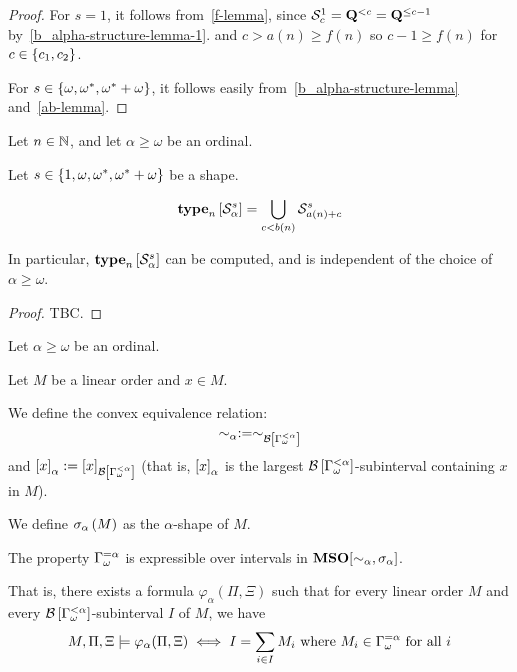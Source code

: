 \begin{proof}
  For $s = 1$, it follows from~\cref{f-lemma}, since $\mathcal{S}^{1}_{c} = \mathbf{Q}^{< c} = \mathbf{Q}^{\le c-1}$
  by~\cref{b_alpha-structure-lemma-1}.
  and $c > a(n) \ge f(n)$ so $c-1 \ge f(n)$ for $c \in \left\{ {c_1, c_2} \right\}$.

  For $s \in \left\{ {\omega, \omega^\ast, \omega^\ast + \omega} \right\}$, it follows easily from~\cref{b_alpha-structure-lemma}
  and~\cref{ab-lemma}.
\end{proof}

\begin{lemma}
  Let $n \in \mathbb{N}$, and let $\alpha \ge \omega$ be an ordinal.

  Let $s \in \left\{ {1, \omega, \omega^\ast, \omega^\ast + \omega} \right\}$ be a shape.

  \[\mathbf{type}_{n} \left[ {\mathcal{S}^{s}_{\alpha}} \right] = \bigcup_{c < b(n)}{\mathcal{S}^{s}_{a(n) + c}                                                                                                                                                                                                                                                                                                                                                                                                                                       }\]

  In particular, $\mathbf{type}_{n} \left[ {\mathcal{S}^{s}_{\alpha}} \right]$ can be
  computed, and is independent of the choice of $\alpha \ge \omega$.
\end{lemma}

\begin{proof}
  TBC.
  
\end{proof}

\begin{definition}
  Let $\alpha \ge \omega$ be an ordinal.

  Let $M$ be a linear order and $x \in M$.

  We define the convex equivalence relation: 
  \[\sim_\alpha := \sim_{\mathcal{B} \left[ {{\Gamma_{\omega}^{< \alpha}}} \right]}\]
  and $\left[ {x} \right]_{\alpha} := \left[ {x} \right]_{\mathcal{B} \left[ {{\Gamma_{\omega}^{< \alpha}}} \right]}$ (that is,
  $\left[ {x} \right]_{\alpha}$ is the largest $\mathcal{B} \left[ {{\Gamma_{\omega}^{< \alpha}}} \right]$-subinterval
  containing $x$ in $M$).

  We define $\sigma_{\alpha} \left( {M} \right)$ as
  the $\alpha$-shape of $M$.
\end{definition}


\begin{lemma}
  The property
  $\Gamma_{\omega}^{= \alpha}$ is expressible over intervals
  in $\mathbf{MSO}[\sim_{\alpha}, \sigma_{\alpha}]$.

  That is, there exists a formula $\varphi_{\alpha}(\Pi, \Xi)$
  such that for every linear order $M$ and every $\mathcal{B} \left[ {{\Gamma_{\omega}^{< \alpha}}} \right]$-subinterval
  $I$ of $M$, we have
  \[
    M, \Pi, \Xi \models \varphi_{\alpha}(\Pi, \Xi) \iff
    I = \sum_{i \in I} M_i
    \text{ where } M_i \in \Gamma_{\omega}^{= \alpha} \text{ for all } i
  \]
\end{lemma}

